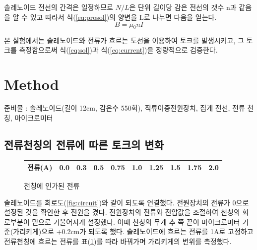 \documentclass[a4paper]{article}
\begin{document}
	솔레노이드 전선의 간격은 일정하므로 $N/L$은 단위 길이당 감은 전선의 갯수 n과 같음을 알 수 있고 따라서 식(\ref{eq:prosol})의 양변을 L로 나누면 다음을 얻는다.
	\begin{equation}
		B = \mu{}_{0}nI
		\label{eq:sol}
	\end{equation}

	본 실험에서는 솔레노이드와 전류가 흐르는 도선을 이용하여 토크를 발생시키고, 그 토크를 측정함으로써 식(\ref{eq:sol})과 식(\ref{eq:current})을 정량적으로 검증한다.

	\section{Method}
	\vspace{-1cm}
		\begin{figure}[h]
			\centering
		\end{figure}
		준비물 : 솔레노이드(길이 12\si{cm}, 감은수 550회), 직류이중전원장치, 집게 전선, 전류 천칭, 마이크로미터
		\subsection{전류천칭의 전류에 따른 토크의 변화}

		\begin{figure}
			\centering
            \vspace{-0.5 cm}
			\begin{tabular}{cccccccccc} 
				\hline \hline
				전류(A) \vline & 0.0 & 0.3 & 0.5 & 0.75 & 1.0 & 1.25 & 1.5 & 1.75 & 2.0 \\
				\hline \hline
			\end{tabular}  \vspace{-0.2cm} \caption{천칭에 인가된 전류}
			\vspace{-0.5cm}
			\label{tb:cirinput}
		\end{figure}
		솔레노이드를 회로도(\ref{fig:circuit})와 같이 되도록 연결했다. 
		전원장치의 전류가 0으로 설정된 것을 확인한 후 전원을 켰다.
		전원장치의 전류와 전압값을 조절하여 천칭의 회로부분이 밑으로 기울어지게 설정했다.
		이때 천칭의 무게 추 쪽 끝이 마이크로미터 기준(가리키게)으로 +0.2\si{cm}가 되도록 했다.
		솔레노이드에 흐르는 전류를 1\si{A}로 고정하고 전류천칭에 흐르는 전류를 표(\ref{tb:cirinput})를 따라 바꿔가며 가리키게의 변위를 측정했다.
\end{document}
